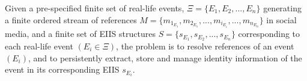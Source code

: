 %
%
%


Given a pre-specified finite set of real-life events, $\Xi = \{E_{1},E_{2}, ... ,E_{n}\}$ generating a finite ordered stream of references $M = \{m_{1_{E_{1}}}, m_{2_{E_{1}}}, ... ,m_{i_{E_{i}}}, ... ,m_{n_{E_{n}}}\}$ in social media, and a finite set of EIIS structures $S = \{s_{E_{1}},s_{E_{2}}, ... ,s_{E_{n}}\}$ corresponding to each real-life event $(E_{i} \in \Xi)$, the problem is to resolve references of an event $(E_{i})$, and to persistently extract, store and manage identity information of the event in its corresponding EIIS $s_{E_{i}}$.





